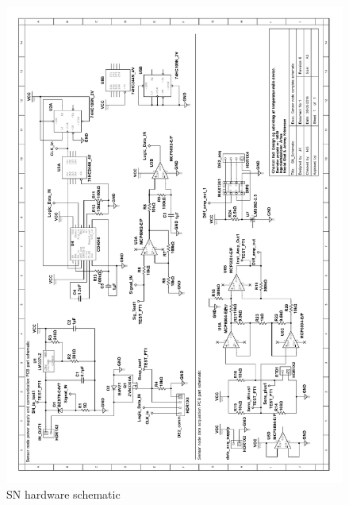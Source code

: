 \begin{figure}[H]
	\centering
	\includegraphics[width=1\textwidth]{billeder/11projectdescription/SN_schematic_rotated}
	\caption{SN hardware schematic}
	\label{schematic:SN}
\end{figure}